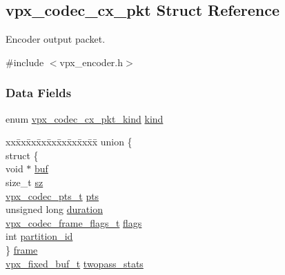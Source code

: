 \hypertarget{structvpx__codec__cx__pkt}{}\subsection{vpx\+\_\+codec\+\_\+cx\+\_\+pkt Struct Reference}
\label{structvpx__codec__cx__pkt}


Encoder output packet.  




{\ttfamily \#include $<$vpx\+\_\+encoder.\+h$>$}

\subsubsection*{Data Fields}
\begin{DoxyCompactItemize}
\item 
enum \hyperlink{group__encoder_ga28a79375279536526552af3a83d2ed72}{vpx\+\_\+codec\+\_\+cx\+\_\+pkt\+\_\+kind} \hyperlink{structvpx__codec__cx__pkt_a41f395b39516343c1329a4a85a0084f2}{kind}
\item 
\begin{tabbing}
xx\=xx\=xx\=xx\=xx\=xx\=xx\=xx\=xx\=\kill
union \{\\
\>struct \{\\
\>\>void $\ast$ \hyperlink{structvpx__codec__cx__pkt_a9e1db068593b6037e70b05b5239784d2}{buf}\\
\>\>size\_t \hyperlink{structvpx__codec__cx__pkt_a857321ba2dc65e81c430d14c36a542d9}{sz}\\
\>\>\hyperlink{group__encoder_ga7e711b0a71c65aef8f0faea8bd57b05f}{vpx\_codec\_pts\_t} \hyperlink{structvpx__codec__cx__pkt_aa75fe039fe6b47fb25d20684864bef12}{pts}\\
\>\>unsigned long \hyperlink{structvpx__codec__cx__pkt_afb8d9069980e759d97d2eb9fae7e5e06}{duration}\\
\>\>\hyperlink{group__encoder_gaac8ee319b9a6175f6946f59437c7ae4b}{vpx\_codec\_frame\_flags\_t} \hyperlink{structvpx__codec__cx__pkt_a3876fe0306342611465e9c15c6c4ae2f}{flags}\\
\>\>int \hyperlink{structvpx__codec__cx__pkt_aaffee6af93af238ca7a145fb56c6d6f7}{partition\_id}\\
\>\} \hyperlink{structvpx__codec__cx__pkt_a81e33bf4408a3983abb16492fee359ff}{frame}\\
\>\hyperlink{group__encoder_ga21fab7dd28065f349c97165501223764}{vpx\_fixed\_buf\_t} \hyperlink{structvpx__codec__cx__pkt_a4018900fa26ecc55abc4703cc7d7c7fc}{twopass\_stats}\\

\end{tabbing}
\end{DoxyCompactItemize}
